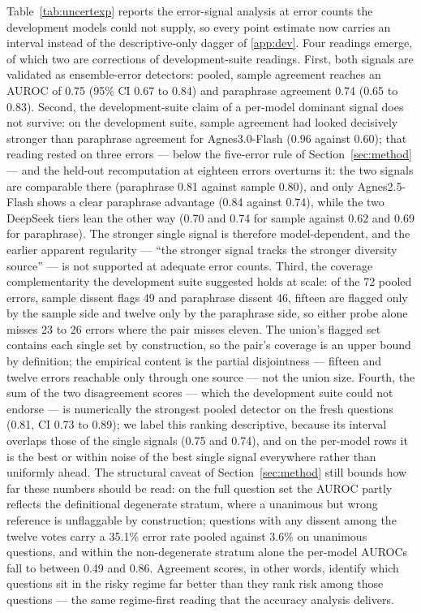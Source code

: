 Table~\ref{tab:uncertexp} reports the error-signal analysis at error counts the development models could not supply, so every point estimate now carries an interval instead of the descriptive-only dagger of \ref{app:dev}. Four readings emerge, of which two are corrections of development-suite readings. First, both signals are validated as ensemble-error detectors: pooled, sample agreement reaches an AUROC of 0.75 (95\% CI 0.67 to 0.84) and paraphrase agreement 0.74 (0.65 to 0.83). Second, the development-suite claim of a per-model dominant signal does not survive: on the development suite, sample agreement had looked decisively stronger than paraphrase agreement for Agnes3.0-Flash (0.96 against 0.60); that reading rested on three errors --- below the five-error rule of Section~\ref{sec:method} --- and the held-out recomputation at eighteen errors overturns it: the two signals are comparable there (paraphrase 0.81 against sample 0.80), and only Agnes2.5-Flash shows a clear paraphrase advantage (0.84 against 0.74), while the two DeepSeek tiers lean the other way (0.70 and 0.74 for sample against 0.62 and 0.69 for paraphrase). The stronger single signal is therefore model-dependent, and the earlier apparent regularity --- ``the stronger signal tracks the stronger diversity source'' --- is not supported at adequate error counts. Third, the coverage complementarity the development suite suggested holds at scale: of the 72 pooled errors, sample dissent flags 49 and paraphrase dissent 46, fifteen are flagged only by the sample side and twelve only by the paraphrase side, so either probe alone misses 23 to 26 errors where the pair misses eleven. The union's flagged set contains each single set by construction, so the pair's coverage is an upper bound by definition; the empirical content is the partial disjointness --- fifteen and twelve errors reachable only through one source --- not the union size. Fourth, the sum of the two disagreement scores --- which the development suite could not endorse --- is numerically the strongest pooled detector on the fresh questions (0.81, CI 0.73 to 0.89); we label this ranking descriptive, because its interval overlaps those of the single signals (0.75 and 0.74), and on the per-model rows it is the best or within noise of the best single signal everywhere rather than uniformly ahead. The structural caveat of Section~\ref{sec:method} still bounds how far these numbers should be read: on the full question set the AUROC partly reflects the definitional degenerate stratum, where a unanimous but wrong reference is unflaggable by construction; questions with any dissent among the twelve votes carry a 35.1\% error rate pooled against 3.6\% on unanimous questions, and within the non-degenerate stratum alone the per-model AUROCs fall to between 0.49 and 0.86. Agreement scores, in other words, identify which questions sit in the risky regime far better than they rank risk among those questions --- the same regime-first reading that the accuracy analysis delivers.

